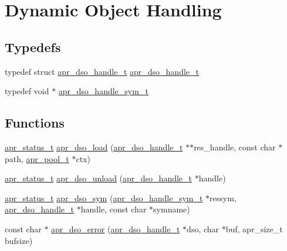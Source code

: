 \hypertarget{group__apr__dso}{\section{Dynamic Object Handling}
\label{group__apr__dso}
}
\subsection*{Typedefs}
\begin{DoxyCompactItemize}
\item 
typedef struct \hyperlink{group__apr__dso_ga85e7e28490d026aeed78bd78e9933472}{apr\-\_\-dso\-\_\-handle\-\_\-t} \hyperlink{group__apr__dso_ga85e7e28490d026aeed78bd78e9933472}{apr\-\_\-dso\-\_\-handle\-\_\-t}
\item 
typedef void $\ast$ \hyperlink{group__apr__dso_gaf1aa0a039e8003586cfdfbc4ac57e775}{apr\-\_\-dso\-\_\-handle\-\_\-sym\-\_\-t}
\end{DoxyCompactItemize}
\subsection*{Functions}
\begin{DoxyCompactItemize}
\item 
\hyperlink{group__apr__errno_gaf76ee4543247e9fb3f3546203e590a6c}{apr\-\_\-status\-\_\-t} \hyperlink{group__apr__dso_gaedc8609c2bb76e5c43f2df2281a9d8b6}{apr\-\_\-dso\-\_\-load} (\hyperlink{group__apr__dso_ga85e7e28490d026aeed78bd78e9933472}{apr\-\_\-dso\-\_\-handle\-\_\-t} $\ast$$\ast$res\-\_\-handle, const char $\ast$path, \hyperlink{group__apr__pools_gaf137f28edcf9a086cd6bc36c20d7cdfb}{apr\-\_\-pool\-\_\-t} $\ast$ctx)
\item 
\hyperlink{group__apr__errno_gaf76ee4543247e9fb3f3546203e590a6c}{apr\-\_\-status\-\_\-t} \hyperlink{group__apr__dso_ga4c7b1b4e98a5d23c56182ece047fbb7b}{apr\-\_\-dso\-\_\-unload} (\hyperlink{group__apr__dso_ga85e7e28490d026aeed78bd78e9933472}{apr\-\_\-dso\-\_\-handle\-\_\-t} $\ast$handle)
\item 
\hyperlink{group__apr__errno_gaf76ee4543247e9fb3f3546203e590a6c}{apr\-\_\-status\-\_\-t} \hyperlink{group__apr__dso_gae84cd7041976787d73a9558e3393b97c}{apr\-\_\-dso\-\_\-sym} (\hyperlink{group__apr__dso_gaf1aa0a039e8003586cfdfbc4ac57e775}{apr\-\_\-dso\-\_\-handle\-\_\-sym\-\_\-t} $\ast$ressym, \hyperlink{group__apr__dso_ga85e7e28490d026aeed78bd78e9933472}{apr\-\_\-dso\-\_\-handle\-\_\-t} $\ast$handle, const char $\ast$symname)
\item 
const char $\ast$ \hyperlink{group__apr__dso_gafa34fc75e1e9b8856385d3b18cfac05c}{apr\-\_\-dso\-\_\-error} (\hyperlink{group__apr__dso_ga85e7e28490d026aeed78bd78e9933472}{apr\-\_\-dso\-\_\-handle\-\_\-t} $\ast$dso, char $\ast$buf, apr\-\_\-size\-\_\-t bufsize)
\end{DoxyCompactItemize}


